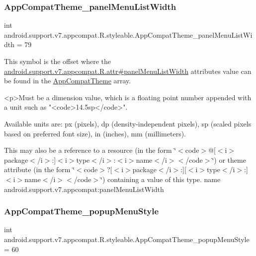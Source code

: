 \subsubsection{\texorpdfstring{App\+Compat\+Theme\+\_\+panel\+Menu\+List\+Width}{AppCompatTheme\_panelMenuListWidth}}
{\footnotesize\ttfamily int android.\+support.\+v7.\+appcompat.\+R.\+styleable.\+App\+Compat\+Theme\+\_\+panel\+Menu\+List\+Width = 79\hspace{0.3cm}{\ttfamily [static]}}

This symbol is the offset where the \hyperlink{classandroid_1_1support_1_1v7_1_1appcompat_1_1R_1_1attr_afe6be40bd1264ce4e4d1ea09fbdd9935}{android.\+support.\+v7.\+appcompat.\+R.\+attr\#panel\+Menu\+List\+Width} attribute\textquotesingle{}s value can be found in the \hyperlink{classandroid_1_1support_1_1v7_1_1appcompat_1_1R_1_1styleable_a5c42f89e8a410c323be34208d75c430b}{App\+Compat\+Theme} array.

\begin{DoxyVerb}      <p>Must be a dimension value, which is a floating point number appended with a unit such as "<code>14.5sp</code>".
\end{DoxyVerb}
 Available units are\+: px (pixels), dp (density-\/independent pixels), sp (scaled pixels based on preferred font size), in (inches), mm (millimeters). 

This may also be a reference to a resource (in the form \char`\"{}$<$code$>$@\mbox{[}$<$i$>$package$<$/i$>$\+:\mbox{]}$<$i$>$type$<$/i$>$\+:$<$i$>$name$<$/i$>$$<$/code$>$\char`\"{}) or theme attribute (in the form \char`\"{}$<$code$>$?\mbox{[}$<$i$>$package$<$/i$>$\+:\mbox{]}\mbox{[}$<$i$>$type$<$/i$>$\+:\mbox{]}$<$i$>$name$<$/i$>$$<$/code$>$\char`\"{}) containing a value of this type.  name android.\+support.\+v7.\+appcompat\+:panel\+Menu\+List\+Width \mbox{\label{classandroid_1_1support_1_1v7_1_1appcompat_1_1R_1_1styleable_a6b864691ad3dd51a0c728b5e6b9cc7f5}} 
\subsubsection{\texorpdfstring{App\+Compat\+Theme\+\_\+popup\+Menu\+Style}{AppCompatTheme\_popupMenuStyle}}
{\footnotesize\ttfamily int android.\+support.\+v7.\+appcompat.\+R.\+styleable.\+App\+Compat\+Theme\+\_\+popup\+Menu\+Style = 60\hspace{0.3cm}{\ttfamily [static]}}

